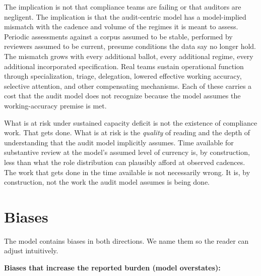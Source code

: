 \documentclass[11pt,letterpaper]{article}
\begin{document}
The implication is not that compliance teams are failing or that auditors are negligent. The implication is that the audit-centric model has a model-implied mismatch with the cadence and volume of the regimes it is meant to assess. Periodic assessments against a corpus assumed to be stable, performed by reviewers assumed to be current, presume conditions the data say no longer hold. The mismatch grows with every additional ballot, every additional regime, every additional incorporated specification. Real teams sustain operational function through specialization, triage, delegation, lowered effective working accuracy, selective attention, and other compensating mechanisms. Each of these carries a cost that the audit model does not recognize because the model assumes the working-accuracy premise is met.

What is at risk under sustained capacity deficit is not the existence of compliance work. That gets done. What is at risk is the \textit{quality} of reading and the depth of understanding that the audit model implicitly assumes. Time available for substantive review at the model's assumed level of currency is, by construction, less than what the role distribution can plausibly afford at observed cadences. The work that gets done in the time available is not necessarily wrong. It is, by construction, not the work the audit model assumes is being done.

\section{Biases}
\label{sec:biases}

The model contains biases in both directions. We name them so the reader can adjust intuitively.

\textbf{Biases that increase the reported burden (model overstates):}
\end{document}
